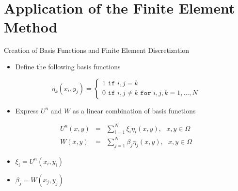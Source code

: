 \documentclass[10pt]{beamer}
\begin{document}
\section{Application of the Finite Element Method}
\begin{frame}{Creation of Basis Functions and Finite Element Discretization} \label{basisfunctionandfinite}
\begin{itemize}
\item Define the following basis functions
\end{itemize}
$$
\eta_{k}\left(x_{i},y_{j}\right)=\begin{cases}
1 \texttt{ if } i,j=k\\
0 \texttt{ if } i,j \neq k \texttt{ for } i,j,k=1,...,N
\end{cases} 
$$

\begin{itemize}
\item Express $U^{n}$ and $W$ as a linear combination of basis functions
\end{itemize}

\begin{eqnarray}\label{UWdiscrete}
U^{n}\left(x,y\right)&=&\sum_{i=1}^{N}\xi_{i}\eta_{i}\left(x,y\right), \texttt{ } x,y \in \Omega \\
\nonumber
W\left(x,y\right)&=&\sum_{j=1}^{N}\beta_{j}\eta_{j}\left(x,y\right), \texttt{ } x,y \in \Omega
\end{eqnarray}

\begin{itemize}
\item $\xi_{i}=U^{n}\left(x_{i},y_{i}\right)$
\item $\beta_{j}=W\left(x_{j},y_{j}\right)$
\end{itemize}

\hyperlink{Questions}{}
\end{frame}
\end{document}
